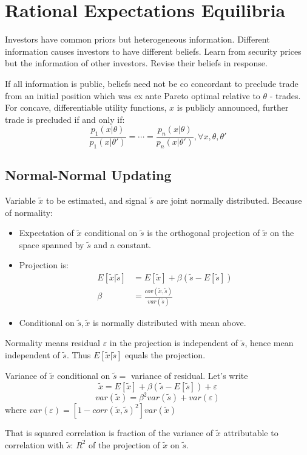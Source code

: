 \documentclass[11pt, a4paper, oneside]{article}
\theoremstyle{definition}
\theoremstyle{proposition}
\theoremstyle{corollary}
\theoremstyle{lemma}
\theoremstyle{theorem}
\begin{document}
\section{Rational Expectations Equilibria}
Investors have common priors but heterogeneous information. Different information causes investors to have different beliefs. Learn from security prices but the information of other investors. Revise their beliefs in response. 

If all information is public, beliefs need not be co concordant to preclude trade from an initial position which was ex ante Pareto optimal relative to $\theta$ - trades. For concave, differentiable utility functions, $x$ is publicly announced, further trade is precluded if and only if:
$$\frac{p_1(x|\theta)}{p_1(x|\theta')} = \cdots = \frac{p_n(x|\theta)}{p_n(x|\theta')}, \forall x, \theta, \theta'$$

\subsection{Normal-Normal Updating}
Variable $\tilde{x}$ to be estimated, and signal $\tilde{s}$ are joint normally distributed. Because of normality: 
\begin{itemize}
\item Expectation of $\tilde{x}$ conditional on $\tilde{s}$ is the orthogonal projection of $\tilde{x}$ on the space spanned by $\tilde{s}$ and a constant.
\item Projection is:
\begin{align*}
E[\tilde{x}|\tilde{s}] &= E[\tilde{x}]  + \beta(\tilde{s} - E[\tilde{s}]) \\
\beta&=\frac{cov(\tilde{x}, \tilde{s})}{var(\tilde{s})}
\end{align*}
\item Conditional on $\tilde{s}, \tilde{x}$ is normally distributed with mean above. 
\end{itemize}
Normality means residual $\varepsilon$ in the projection is independent of $\tilde{s}$, hence mean independent of $\tilde{s}$. Thus $E[\tilde{x}|\tilde{s}]$ equals the projection.

Variance of $\tilde{x}$ conditional on $\tilde{s} = $ variance of residual. Let's write
$$\tilde{x} = E[\tilde{x}] + \beta(\tilde{s} - E[\tilde{s}]) + \varepsilon$$
$$var(\tilde{x}) = \beta^2var(\tilde{s}) + var(\varepsilon)$$
where $var(\varepsilon) = [1 -corr(\tilde{x}, \tilde{s})^2]var(\tilde{x})$ 

That is squared correlation is fraction of the variance of $ \tilde{x}$ attributable to correlation with $\tilde{s}$: $R^2$ of the projection of $\tilde{x}$ on $\tilde{s}$. 
\end{document}
